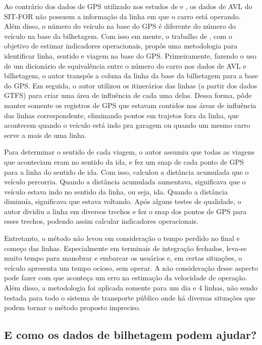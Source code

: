 \documentclass[        
    a4paper,          %
    12pt,             %
    chapter=TITLE,    %
    section=Title,    %
    subsection=Title, %
    oneside,          %
    english,          %
    spanish,          %
    brazil,           %
    fleqn             %
]{abntex2}
\begin{document}
  Ao contrário dos dados de GPS utilizado nos estudos de \citet{Wessel2017} e \citet{Arbex2016}, os dados de AVL do SIT-FOR não possuem a informação da linha em que o carro está operando. Além disso, o número do veículo na base do GPS é diferente do número do veículo na base da bilhetagem. Com isso em mente, o trabalho de \citet{Rabay2017}, com o objetivo de estimar indicadores operacionais, propôs uma metodologia para identificar linha, sentido e viagem na base do GPS. Primeiramente, fazendo o uso de um dicionário de equivalência entre o número do carro nos dados de AVL e bilhetagem, o autor transpôs a coluna da linha da base da bilhetagem para a base do GPS. Em seguida, o autor utilizou os itinerários das linhas (a partir dos dados GTFS) para criar uma área de influência de cada uma delas. Dessa forma, pôde manter somente os registros de GPS que estavam contidos nas áreas de influência das linhas correspondente, eliminando pontos em trajetos fora da linha, que acontecem quando o veículo está indo pra garagem ou quando um mesmo carro serve a mais de uma linha.
  
  Para determinar o sentido de cada viagem, o autor assumiu que todas as viagens que aconteciam eram no sentido da ida, e fez um snap de cada ponto de GPS para a linha do sentido de ida. Com isso, calculou a distância acumulada que o veículo percorria. Quando a distância acumulada aumentava, significava que o veículo estava indo no sentido da linha, ou seja, ida. Quando a distância diminuía, significava que estava voltando. Após alguns testes de qualidade, o autor dividiu a linha em diversos trechos e fez o snap dos pontos de GPS para esses trechos, podendo assim calcular indicadores operacionais.
  
  Entretanto, o método não levou em consideração o tempo perdido no final e começo das linhas. Especialmente em terminais de integração fechados, leva-se muito tempo para manobrar e embarcar os usuários e, em certas situações, o veículo apresenta um tempo ocioso, sem operar. A não consideração desse aspecto pode fazer com que aconteça um erro na estimação da velocidade de operação. Além disso, a metodologia foi aplicada somente para um dia e 4 linhas, não sendo testada para todo o sistema de transporte público onde há diversas situações que podem tornar o método proposto impreciso.
  
  \hypertarget{e-como-os-dados-de-bilhetagem-podem-ajudar}{%
  \subsection{E como os dados de bilhetagem podem ajudar?}\label{e-como-os-dados-de-bilhetagem-podem-ajudar}}
  
\end{document}
